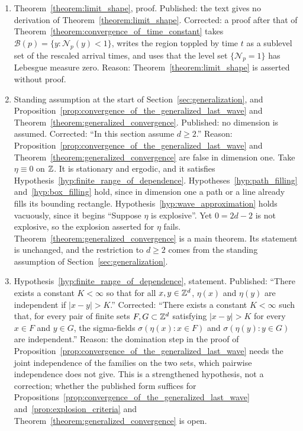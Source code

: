 \documentclass[12pt]{amsart}
\begin{document}
\begin{enumerate}
\item[C10.] Theorem~\ref{theorem:limit_shape}, proof. Published: the text gives no derivation of Theorem~\ref{theorem:limit_shape}. Corrected: a proof after that of Theorem~\ref{theorem:convergence_of_time_constant} takes $\mathcal B(p)=\{y:\mathcal N_p(y)<1\}$, writes the region toppled by time $t$ as a sublevel set of the rescaled arrival times, and uses that the level set $\{\mathcal N_p=1\}$ has Lebesgue measure zero. Reason: Theorem~\ref{theorem:limit_shape} is asserted without proof.
\item[C11.] Standing assumption at the start of Section~\ref{sec:generalization}, and Proposition~\ref{prop:convergence_of_the_generalized_last_wave} and Theorem~\ref{theorem:generalized_convergence}. Published: no dimension is assumed. Corrected: ``In this section assume $d\geq2$.'' Reason: Proposition~\ref{prop:convergence_of_the_generalized_last_wave} and Theorem~\ref{theorem:generalized_convergence} are false in dimension one. Take $\eta\equiv0$ on $\mathbb{Z}$. It is stationary and ergodic, and it satisfies Hypothesis~\ref{hyp:finite_range_of_dependence}. Hypotheses~\ref{hyp:path_filling} and~\ref{hyp:box_filling} hold, since in dimension one a path or a line already fills its bounding rectangle. Hypothesis~\ref{hyp:wave_approximation} holds vacuously, since it begins ``Suppose $\eta$ is explosive''. Yet $0=2d-2$ is not explosive, so the explosion asserted for $\eta$ fails. Theorem~\ref{theorem:generalized_convergence} is a main theorem. Its statement is unchanged, and the restriction to $d\geq2$ comes from the standing assumption of Section~\ref{sec:generalization}.
\item[C12.] Hypothesis~\ref{hyp:finite_range_of_dependence}, statement. Published: ``There exists a constant $K<\infty$ so that for all $x,y\in\mathbb{Z}^d$, $\eta(x)$ and $\eta(y)$ are independent if $|x-y|>K$.'' Corrected: ``There exists a constant $K < \infty$ such that, for every pair of finite sets $F,G \subset \mathbb{Z}^d$ satisfying $|x-y| > K$ for every $x \in F$ and $y \in G$, the sigma-fields $\sigma(\eta(x):x\in F)$ and $\sigma(\eta(y):y\in G)$ are independent.'' Reason: the domination step in the proof of Proposition~\ref{prop:convergence_of_the_generalized_last_wave} needs the joint independence of the families on the two sets, which pairwise independence does not give. This is a strengthened hypothesis, not a correction; whether the published form suffices for Propositions~\ref{prop:convergence_of_the_generalized_last_wave} and~\ref{prop:explosion_criteria} and Theorem~\ref{theorem:generalized_convergence} is open.

\end{enumerate}
\end{document}
